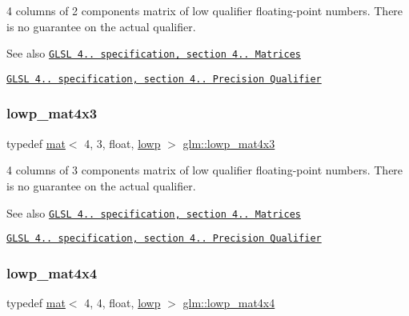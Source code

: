 4 columns of 2 components matrix of low qualifier floating-\/point numbers. There is no guarantee on the actual qualifier.

\begin{DoxySeeAlso}{See also}
\href{http://www.opengl.org/registry/doc/GLSLangSpec.4.20.8.pdf}{\tt G\+L\+SL 4.. specification, section 4.. Matrices} 

\href{http://www.opengl.org/registry/doc/GLSLangSpec.4.20.8.pdf}{\tt G\+L\+SL 4.. specification, section 4.. Precision Qualifier} 
\end{DoxySeeAlso}
\mbox{\label{group__core__precision_ga23926fa6809eae2c18451a1a7b4dd6a8}} 
\subsubsection{\texorpdfstring{lowp\+\_\+mat4x3}{lowp\_mat4x3}}
{\footnotesize\ttfamily typedef \hyperlink{structglm_1_1mat}{mat}$<$ 4, 3, float, \hyperlink{namespaceglm_a36ed105b07c7746804d7fdc7cc90ff25ae161af3fc695e696ce3bf69f7332bc2d}{lowp} $>$ \hyperlink{group__core__precision_ga23926fa6809eae2c18451a1a7b4dd6a8}{glm\+::lowp\+\_\+mat4x3}}

4 columns of 3 components matrix of low qualifier floating-\/point numbers. There is no guarantee on the actual qualifier.

\begin{DoxySeeAlso}{See also}
\href{http://www.opengl.org/registry/doc/GLSLangSpec.4.20.8.pdf}{\tt G\+L\+SL 4.. specification, section 4.. Matrices} 

\href{http://www.opengl.org/registry/doc/GLSLangSpec.4.20.8.pdf}{\tt G\+L\+SL 4.. specification, section 4.. Precision Qualifier} 
\end{DoxySeeAlso}
\mbox{\label{group__core__precision_gaf8957db9f94a9c01a63db849da81bea0}} 
\subsubsection{\texorpdfstring{lowp\+\_\+mat4x4}{lowp\_mat4x4}}
{\footnotesize\ttfamily typedef \hyperlink{structglm_1_1mat}{mat}$<$ 4, 4, float, \hyperlink{namespaceglm_a36ed105b07c7746804d7fdc7cc90ff25ae161af3fc695e696ce3bf69f7332bc2d}{lowp} $>$ \hyperlink{group__core__precision_gaf8957db9f94a9c01a63db849da81bea0}{glm\+::lowp\+\_\+mat4x4}}

